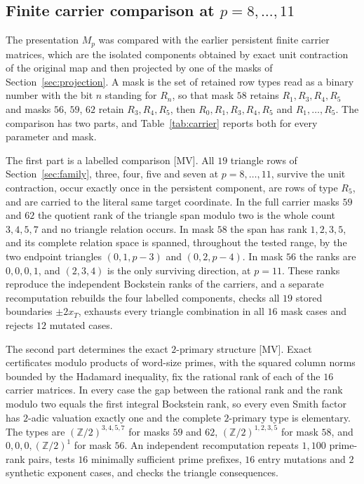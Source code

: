 \documentclass[11pt]{article}
\theoremstyle{definition}
\theoremstyle{remark}
\newcommand{\Z}{\mathbb Z}
\begin{document}
\subsection{Finite carrier comparison at \texorpdfstring{$p=8,\ldots,11$}{p = 8 to 11}}\label{sec:carrier}

The presentation $M_p$ was compared with the earlier persistent finite carrier
matrices, which are the isolated components obtained by exact unit contraction
of the original map and then projected by one of the masks of
Section~\ref{sec:projection}. A mask is the set of retained row types read as
a binary number with the bit $n$ standing for $R_n$, so that mask $58$ retains
$R_1,R_3,R_4,R_5$ and masks $56$, $59$, $62$ retain $R_3,R_4,R_5$, then
$R_0,R_1,R_3,R_4,R_5$ and $R_1,\ldots,R_5$. The comparison has two parts, and
Table~\ref{tab:carrier} reports both for every parameter and mask.

The first part is a labelled comparison [MV]. All $19$ triangle rows of
Section~\ref{sec:family}, three, four, five and seven at $p=8,\ldots,11$,
survive the unit contraction, occur exactly once in the persistent component, are
rows of type $R_5$, and are carried to the literal same target coordinate. In the
full carrier masks $59$ and $62$ the quotient rank of the triangle span modulo two is
the whole count $3,4,5,7$ and no triangle relation occurs. In mask $58$ the span has
rank $1,2,3,5$, and its complete relation space is spanned, throughout the tested
range, by the two endpoint triangles $(0,1,p-3)$ and $(0,2,p-4)$. In mask $56$ the ranks
are $0,0,0,1$, and $(2,3,4)$ is the only surviving direction, at $p=11$. These ranks
reproduce the independent Bockstein ranks of the carriers, and a separate recomputation
rebuilds the four labelled components, checks all $19$ stored boundaries $\pm2x_T$,
exhausts every triangle combination in all $16$ mask cases and rejects $12$ mutated cases.

The second part determines the exact $2$-primary structure [MV]. Exact certificates
modulo products of word-size primes, with the squared column norms bounded by the Hadamard
inequality, fix the rational rank of each of the $16$ carrier matrices. In every case the gap between
the rational rank and the rank modulo two equals the first integral Bockstein rank, so every
even Smith factor has $2$-adic valuation exactly one and the complete $2$-primary
type is elementary. The types are $(\Z/2)^{3,4,5,7}$ for masks $59$ and $62$,
$(\Z/2)^{1,2,3,5}$ for mask $58$, and $0,0,0,(\Z/2)^1$ for mask $56$. An independent
recomputation repeats $1{,}100$ prime-rank pairs, tests $16$ minimally sufficient prime
prefixes, $16$ entry mutations and $2$ synthetic exponent cases, and checks the triangle consequences.
\end{document}
